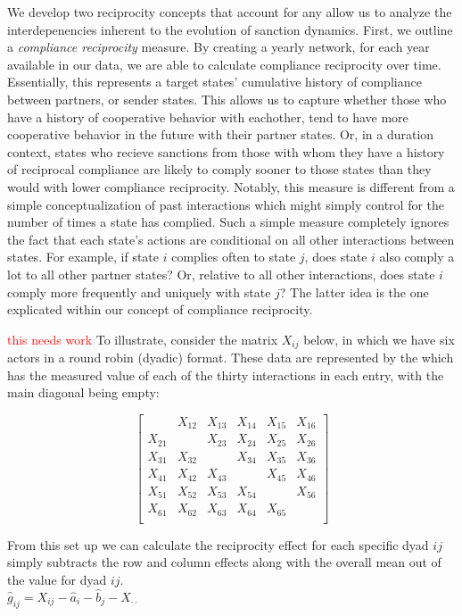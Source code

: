 We develop two reciprocity concepts that account for any allow us to analyze the interdepenencies inherent to the evolution of sanction dynamics. First, we outline a \textit{compliance reciprocity} measure. By creating a yearly network, for each year available in our data, we are able to calculate compliance reciprocity over time. Essentially, this represents a target states' cumulative history of compliance between partners, or sender states. This allows us to capture whether those who have a history of cooperative behavior with eachother, tend to have more cooperative behavior in the future with their partner states. Or, in a duration context, states who recieve sanctions from those with whom they have a history of reciprocal compliance are likely to comply sooner to those states than they would with lower compliance reciprocity. Notably, this measure is different from a simple conceptualization of past interactions which might simply control for the number of times a state has complied. Such a simple measure completely ignores the fact that each state's actions are conditional on all other interactions between states. For example, if state $i$ complies often to state $j$, does state $i$ also comply a lot to all other partner states? Or, relative to all other interactions, does state $i$ comply more frequently and uniquely with state $j$? The latter idea is the one explicated within our  concept of compliance reciprocity. 

\textcolor{red}{this needs work}
To illustrate, consider the matrix $X_{ij}$ below, in which we have six actors in a round robin (dyadic) format.  These data are represented by the  which has the measured value of each of the thirty interactions in each entry, with the main diagonal being empty:

\singlespacing
\[
\left[
\begin{array}{cccccc}
 & X_{12}  & X_{13}  & X_{14} & X_{15} & X_{16} \\
X_{21}  &  & X_{23}  & X_{24} & X_{25} & X_{26} \\
X_{31}  & X_{32}  &    & X_{34} & X_{35} & X_{36} \\
X_{41}  & X_{42}  & X_{43}  &  & X_{45} & X_{46} \\
X_{51}  & X_{52}  & X_{53}  & X_{54} &   & X_{56} \\
X_{61}  & X_{62}  & X_{63}  & X_{64} & X_{65} &   \\
\end{array}
\right]
\]

\doublespacing
From this set up we can calculate the reciprocity effect for each specific dyad $ij$ simply subtracts the row and column effects along with the overall mean out of the value for dyad $ij$. \\
$\hat{g}_{ij} = X_{ij} - \hat{a}_i - \hat{b}_j - X_{\cdot \cdot}$

